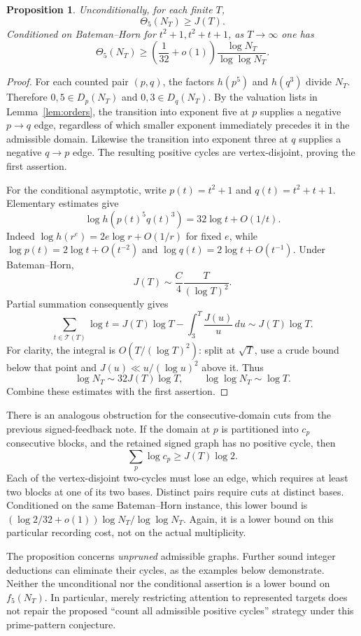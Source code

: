 \documentclass[11pt]{article}
\newtheorem{proposition}[theorem]{Proposition}
\begin{document}
\begin{proposition}\label{prop:targetcycles}
Unconditionally, for each finite $T$,
\[
 \boxed{\Theta_5(N_T)\ge J(T).}
\]
Conditioned on Bateman--Horn for $t^2+1,t^2+t+1$, as $T\to\infty$ one has
\[
 \boxed{\Theta_5(N_T)\ge
 \left(\frac1{32}+o(1)\right)
 \frac{\log N_T}{\log\log N_T}.}
\]
\end{proposition}
\begin{proof}
For each counted pair $(p,q)$, the factors $h(p^5)$ and $h(q^3)$ divide $N_T$. Therefore $0,5\in D_p(N_T)$ and $0,3\in D_q(N_T)$. By the valuation lists in Lemma~\ref{lem:orders}, the transition into exponent five at $p$ supplies a negative $p\to q$ edge, regardless of which smaller exponent immediately precedes it in the admissible domain. Likewise the transition into exponent three at $q$ supplies a negative $q\to p$ edge. The resulting positive cycles are vertex-disjoint, proving the first assertion.

For the conditional asymptotic, write $p(t)=t^2+1$ and $q(t)=t^2+t+1$. Elementary estimates give
\[
 \log h(p(t)^5q(t)^3)=32\log t+O(1/t).
\]
Indeed $\log h(r^e)=2e\log r+O(1/r)$ for fixed $e$, while $\log p(t)=2\log t+O(t^{-2})$ and $\log q(t)=2\log t+O(t^{-1})$. Under Bateman--Horn,
\[
 J(T)\sim\frac C4\frac{T}{(\log T)^2}.
\]
Partial summation consequently gives
\[
 \sum_{t\in\mathcal T(T)}\log t
 =J(T)\log T-\int_3^T\frac{J(u)}u\,du
 \sim J(T)\log T.
\]
For clarity, the integral is $O(T/(\log T)^2)$: split at $\sqrt T$, use a crude bound below that point and $J(u)\ll u/(\log u)^2$ above it. Thus
\[
 \log N_T\sim32J(T)\log T,
 \qquad \log\log N_T\sim\log T.
\]
Combine these estimates with the first assertion.
\end{proof}

There is an analogous obstruction for the consecutive-domain cuts from the previous signed-feedback note. If the domain at $p$ is partitioned into $c_p$ consecutive blocks, and the retained signed graph has no positive cycle, then
\[
 \sum_p\log c_p\ge J(T)\log2.
\]
Each of the vertex-disjoint two-cycles must lose an edge, which requires at least two blocks at one of its two bases. Distinct pairs require cuts at distinct bases. Conditioned on the same Bateman--Horn instance, this lower bound is $(\log2/32+o(1))\log N_T/\log\log N_T$. Again, it is a lower bound on this particular recording cost, not on the actual multiplicity.

The proposition concerns \emph{unpruned} admissible graphs. Further sound integer deductions can eliminate their cycles, as the examples below demonstrate. Neither the unconditional nor the conditional assertion is a lower bound on $f_5(N_T)$. In particular, merely restricting attention to represented targets does not repair the proposed ``count all admissible positive cycles'' strategy under this prime-pattern conjecture.
\end{document}
